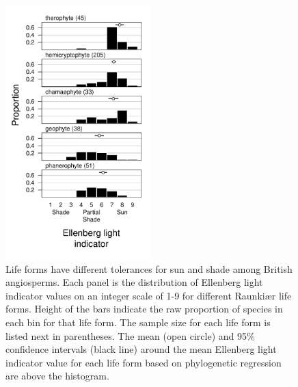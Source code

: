 \documentclass[12pt, oneside]{article}
\begin{document}
\begin{figure}[ht]
\centerline{\includegraphics[width=0.5\textwidth]{figures/figure_lf-light.pdf}}
\caption{Life forms have different tolerances for sun and shade among British angiosperms. Each panel is the distribution of Ellenberg light indicator values on an integer scale of 1-9 for different Raunki\ae r life forms. Height of the bars indicate the raw proportion of species in each bin for that life form. The sample size for each life form is listed next in parentheses. The mean (open circle) and 95\% confidence intervals (black line) around the mean Ellenberg light indicator value for each life form based on phylogenetic regression are above the histogram.} 
\label{fig:lf-light}
\end{figure}
\end{document}
